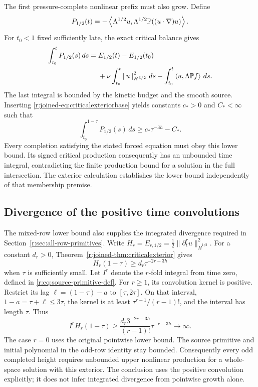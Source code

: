 The first pressure-complete nonlinear prefix must also grow. Define
\[
P_{1/2}(t)
=-\left\langle \Lambda^{1/2}u,\Lambda^{1/2}\mathbb P((u\cdot\nabla)u)\right\rangle.
\]
For $t_0<1$ fixed sufficiently late, the exact critical balance gives
\begin{equation*}
\begin{aligned}
\int_{t_0}^{t}P_{1/2}(s)\,ds
={}&E_{1/2}(t)-E_{1/2}(t_0)\\
&+\nu\int_{t_0}^{t}\left\lVert u\right\rVert_{\dot H^{3/2}}^2\,ds
-\int_{t_0}^{t}\left\langle u,\Lambda\mathbb P f\right\rangle\,ds .
\end{aligned}
\end{equation*}
The last integral is bounded by the kinetic budget and the smooth source. Inserting \eqref{r:joined-eq:criticalexteriorbase} yields constants $c_*>0$ and $C_*<\infty$ such that
\begin{equation}\label{r:joined-eq:exteriorcriticalprefix}
\int_{t_0}^{1-\tau}P_{1/2}(s)\,ds
\ge c_*\tau^{-3h}-C_* .
\end{equation}
Every completion satisfying the stated forced equation must obey this
lower bound. Its signed critical production consequently has an
unbounded time integral, contradicting the finite production bound
for a solution in the full intersection. The exterior calculation
establishes the lower bound independently of that membership premise.


\subsection{Divergence of the positive time convolutions}

The mixed-row lower bound also supplies the integrated divergence
required in Section~\ref{r:sec:all-row-primitives}. Write
\(H_r=E_{r,1/2}=\tfrac12\|\partial_t^r u\|_{\dot H^{1/2}}^2\).
For a constant \(d_r>0\), Theorem~\ref{r:joined-thm:criticalexterior} gives
\[
 H_r(1-\tau)\ge d_r\tau^{-2r-3h}
\]
when \(\tau\) is sufficiently small. Let \(I^r\) denote the
\(r\)-fold integral from time zero, defined in
\eqref{r:eq:source-primitive-def}. For \(r\ge1\), its convolution
kernel is positive. Restrict its lag
\(\ell=(1-\tau)-a\) to \([\tau,2\tau]\). On that interval,
\(1-a=\tau+\ell\le3\tau\), the kernel is at least
\(\tau^{r-1}/(r-1)!\), and the interval has length \(\tau\). Thus
\begin{equation}
 I^rH_r(1-\tau)
 \ge\frac{d_r3^{-2r-3h}}{(r-1)!}\tau^{-r-3h}
 \longrightarrow\infty.
\label{r:eq:positive-row-convolution}
\end{equation}
The case \(r=0\) uses the original pointwise lower bound. The source
primitive and initial polynomial in the odd-row identity stay bounded.
Consequently every odd completed height requires unbounded upper
nonlinear production for a whole-space solution with this exterior.
The conclusion uses the positive convolution explicitly; it does not
infer integrated divergence from pointwise growth alone.
